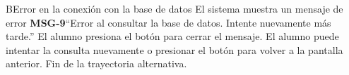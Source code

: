 \begin{UCtrayectoriaA}{B}{Error en la conexión con la base de datos}
	\UCpaso El sistema muestra un mensaje de error {\bf MSG-9}{``Error al consultar la base de datos. Intente nuevamente más tarde.''}
	\UCpaso[\UCactor] El alumno presiona el botón  para cerrar el mensaje.
	\UCpaso[\UCactor] El alumno puede intentar la consulta nuevamente o presionar el botón  para volver a la pantalla anterior.
	\UCpaso Fin de la trayectoria alternativa.
\end{UCtrayectoriaA}

